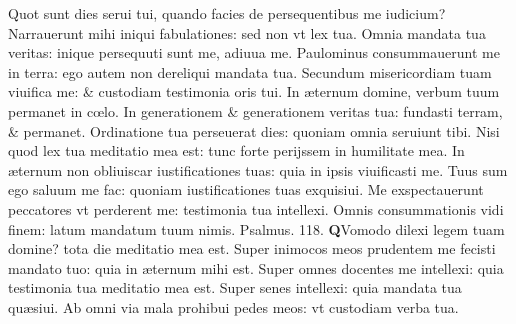 \documentclass[a5paper,10pt]{book}
\def\ae{æ}
\def\oe{œ}
\begin{document}
\begin{multicols*}{2}
\newline \color{red} Q\color{black}uot sunt dies serui tui, quando facies de persequentibus me iudicium?
\newline \color{red} N\color{black}arrauerunt mihi iniqui fabulationes: sed non vt lex tua.
\newline \color{red} O\color{black}mnia mandata tua veritas: inique persequuti sunt me, adiuua me.
\newline \color{red} P\color{black}aulominus consummauerunt me in terra: ego autem non dereliqui mandata tua.
\newline \color{red} S\color{black}ecundum misericordiam tuam viuifica me: \& custodiam testimonia oris tui.
\newline \color{red} I\color{black}n \ae ternum domine, verbum tuum permanet in c\oe lo.
\newline \color{red} I\color{black}n generationem \& generationem veritas tua: fundasti terram, \& permanet.
\newline \color{red} O\color{black}rdinatione tua perseuerat dies: quoniam omnia seruiunt tibi.
\newline \color{red} N\color{black}isi quod lex tua meditatio mea est: tunc forte perijssem in humilitate mea.
\newline \color{red} I\color{black}n \ae ternum non obliuiscar iustificationes tuas: quia in ipsis viuificasti me.
\newline \color{red} T\color{black}uus sum ego saluum me fac: quoniam iustificationes tuas exquisiui.
\newline \color{red} M\color{black}e exspectauerunt peccatores vt perderent me: testimonia tua intellexi.
\newline \color{red} O\color{black}mnis consummationis vidi finem: latum mandatum tuum nimis. \quad \color{red} Psalmus. 118. \color{black}
\vspace{-.5em}
\lettrine[lines=2]{\bfseries \color{red} Q}{}Vomodo dilexi legem tuam domine? tota die meditatio mea est.
\newline \color{red} S\color{black}uper inimocos meos prudentem me fecisti mandato tuo: quia in \ae ternum mihi est.
\newline \color{red} S\color{black}uper omnes docentes me intellexi: quia testimonia tua meditatio mea est.
\newline \color{red} S\color{black}uper senes intellexi: quia mandata tua qu\ae siui.
\newline \color{red} A\color{black}b omni via mala prohibui pedes meos: vt custodiam verba tua.

\end{multicols*}
\end{document}
